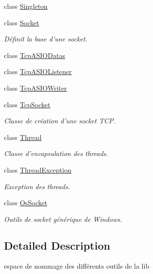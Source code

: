 \begin{DoxyCompactItemize}
class \hyperlink{classmognetwork_1_1_singleton}{Singleton}
\item 
class \hyperlink{classmognetwork_1_1_socket}{Socket}
\begin{DoxyCompactList}\small\item\em Définit la base d'une socket. \end{DoxyCompactList}\item 
class \hyperlink{classmognetwork_1_1_tcp_a_s_i_o_datas}{Tcp\-A\-S\-I\-O\-Datas}
\item 
class \hyperlink{classmognetwork_1_1_tcp_a_s_i_o_listener}{Tcp\-A\-S\-I\-O\-Listener}
\item 
class \hyperlink{classmognetwork_1_1_tcp_a_s_i_o_writer}{Tcp\-A\-S\-I\-O\-Writer}
\item 
class \hyperlink{classmognetwork_1_1_tcp_socket}{Tcp\-Socket}
\begin{DoxyCompactList}\small\item\em Classe de création d'une socket T\-C\-P. \end{DoxyCompactList}\item 
class \hyperlink{classmognetwork_1_1_thread}{Thread}
\begin{DoxyCompactList}\small\item\em Classe d'encapsulation des threads. \end{DoxyCompactList}\item 
class \hyperlink{classmognetwork_1_1_thread_exception}{Thread\-Exception}
\begin{DoxyCompactList}\small\item\em Exception des threads. \end{DoxyCompactList}\item 
class \hyperlink{classmognetwork_1_1_os_socket}{Os\-Socket}
\begin{DoxyCompactList}\small\item\em Outils de socket générique de Windows. \end{DoxyCompactList}\end{DoxyCompactItemize}


\subsection{Detailed Description}
espace de nommage des différents outils de la lib 